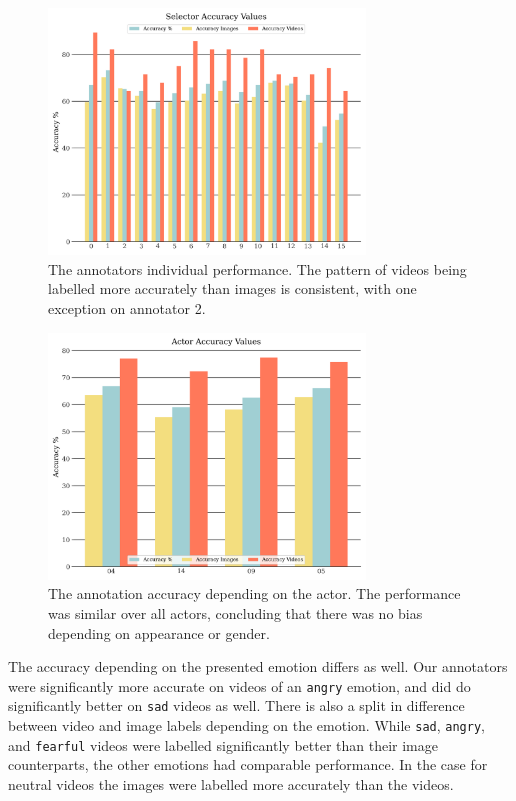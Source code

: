 \begin{figure}
    \centering
    \includegraphics[width=0.75\textwidth]{res/Selector_overview.png}
    \caption{The annotators individual performance. The pattern of videos being labelled more accurately than images is consistent, with one exception on annotator 2.}
    \label{fig:selector_overview}
\end{figure}
\begin{figure}
    \centering
    \includegraphics[width=0.75\textwidth]{res/Actor_overview.png}
    \caption{The annotation accuracy depending on the actor. The performance was similar over all actors, concluding that there was no bias depending on appearance or gender.}
    \label{fig:actor_overview}
\end{figure}

The accuracy depending on the presented emotion differs as well. Our annotators were significantly more accurate on videos of an \texttt{angry} emotion, and did do significantly better on \texttt{sad} videos as well. There is also a split in difference between video and image labels depending on the emotion. While \texttt{sad}, \texttt{angry}, and \texttt{fearful} videos were labelled significantly better than their image counterparts, the other emotions had comparable performance. In the case for neutral videos the images were labelled more accurately than the videos.
